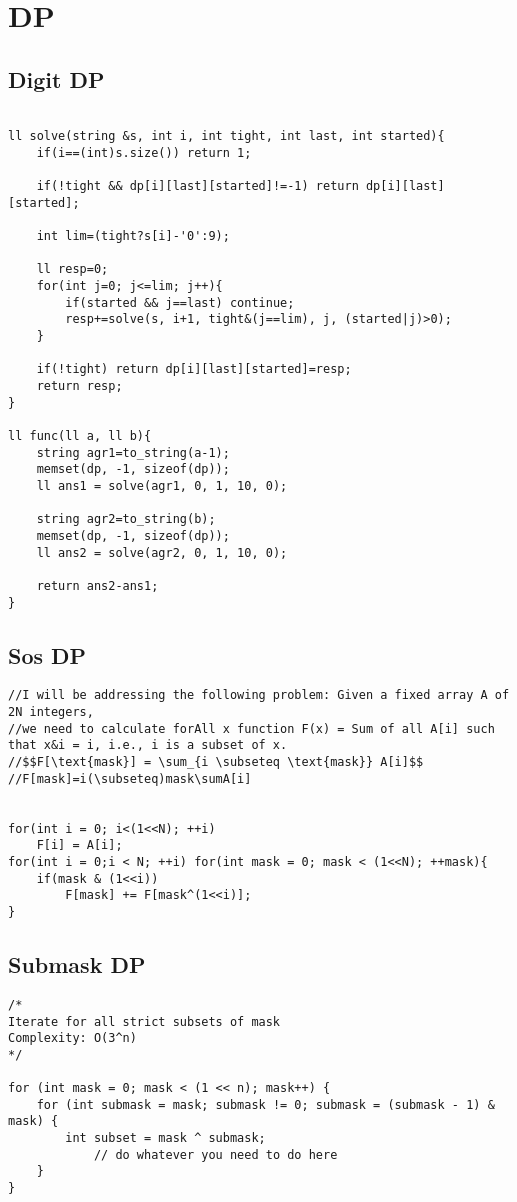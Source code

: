 \documentclass[11pt, a4paper, twoside]{article}
\begin{document}
%
%

\section{DP}

\subsection{Digit DP}
\begin{verbatim}

ll solve(string &s, int i, int tight, int last, int started){ 
    if(i==(int)s.size()) return 1;
    
    if(!tight && dp[i][last][started]!=-1) return dp[i][last][started];
    
    int lim=(tight?s[i]-'0':9);
    
    ll resp=0;
    for(int j=0; j<=lim; j++){
        if(started && j==last) continue;
        resp+=solve(s, i+1, tight&(j==lim), j, (started|j)>0);
    }
    
    if(!tight) return dp[i][last][started]=resp;
    return resp;
}

ll func(ll a, ll b){
    string agr1=to_string(a-1);
    memset(dp, -1, sizeof(dp));
    ll ans1 = solve(agr1, 0, 1, 10, 0);
    
    string agr2=to_string(b);
    memset(dp, -1, sizeof(dp));
    ll ans2 = solve(agr2, 0, 1, 10, 0);
        
    return ans2-ans1;
}
\end{verbatim}

\subsection{Sos DP}
\begin{verbatim}
//I will be addressing the following problem: Given a fixed array A of 2N integers,
//we need to calculate forAll x function F(x) = Sum of all A[i] such that x&i = i, i.e., i is a subset of x.
//$$F[\text{mask}] = \sum_{i \subseteq \text{mask}} A[i]$$
//F[mask]=i(\subseteq)mask\sumA[i]


for(int i = 0; i<(1<<N); ++i)
	F[i] = A[i];
for(int i = 0;i < N; ++i) for(int mask = 0; mask < (1<<N); ++mask){
	if(mask & (1<<i))
		F[mask] += F[mask^(1<<i)];
}
\end{verbatim}

\subsection{Submask DP}
\begin{verbatim}
/*
Iterate for all strict subsets of mask
Complexity: O(3^n)
*/

for (int mask = 0; mask < (1 << n); mask++) {
    for (int submask = mask; submask != 0; submask = (submask - 1) & mask) {
        int subset = mask ^ submask;
            // do whatever you need to do here
    }
}

\end{verbatim}
\end{document}
